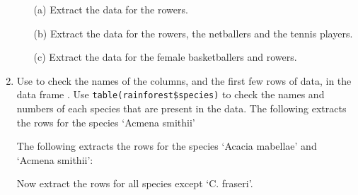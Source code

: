 \begin{enumerate}
\begin{itemize}
\item[(a)] Extract the data for the rowers.
\item[(b)] Extract the data for the rowers, the netballers and the
tennis players.
\item[(c)] Extract the data for the female basketballers and rowers.
\end{itemize}
\item Use  to check the names of the columns, and the first
few rows of data, in the data frame .
Use \verb!table(rainforest$species)! to check the names and numbers of
each species that are present in the data.
The following extracts the rows for the species `Acmena smithii'
\begin{knitrout}
\color{fgcolor}\begin{kframe}
\begin{alltt}
 \hlkwb{<-} \hlopt{==}\hlstd{)}
\end{alltt}
\end{kframe}
\end{knitrout}
The following extracts the rows for the species `Acacia mabellae' and
`Acmena smithii':
\begin{fullwidth}

\begin{knitrout}
\color{fgcolor}
\end{knitrout}

\end{fullwidth}
Now extract the rows for all species except `C. fraseri'.
\end{enumerate}
\cleartooddpage
